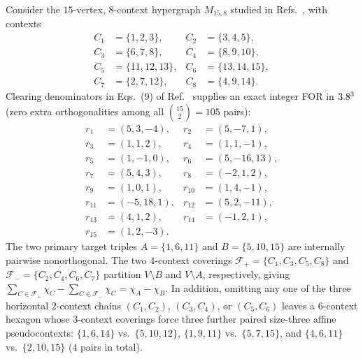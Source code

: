 \documentclass[aps,pra,reprint,superscriptaddress,longbibliography,nofootinbib,floatfix,10pt]{revtex4-2}
\theoremstyle{definition}\newtheorem{definition}[theorem]{Definition}
\theoremstyle{remark}\newtheorem{remark}[theorem]{Remark}
\begin{document}
Consider the $15$-vertex, $8$-context hypergraph $M_{15,8}$ studied in Refs.~\cite{Navara_1995,Mayet_2000,2023-navara-svozil,2026-Navara-Svozil-pseudocontexts}, with contexts
\begin{equation}\label{eq:M15-contexts}
\begin{aligned}
C_1&=\{1,2,3\},& C_2&=\{3,4,5\},\\
C_3&=\{6,7,8\},& C_4&=\{8,9,10\},\\
C_5&=\{11,12,13\},& C_6&=\{13,14,15\},\\
C_7&=\{2,7,12\},& C_8&=\{4,9,14\}.
\end{aligned}
\end{equation}
Clearing denominators in Eqs.~(9) of Ref.~\cite{2023-navara-svozil} supplies an exact integer FOR in $3.8^3$ (zero extra orthogonalities among all $\binom{15}{2}=105$ pairs):
\begin{equation}\label{eq:M15-vectors}
\begin{aligned}
r_1&=(5,3,-4),& r_2&=(5,-7,1),\\
r_3&=(1,1,2),& r_4&=(1,1,-1),\\
r_5&=(1,-1,0),& r_6&=(5,-16,13),\\
r_7&=(5,4,3),& r_8&=(-2,1,2),\\
r_9&=(1,0,1),& r_{10}&=(1,4,-1),\\
r_{11}&=(-5,18,1),& r_{12}&=(5,2,-11),\\
r_{13}&=(4,1,2),& r_{14}&=(-1,2,1),\\
r_{15}&=(1,2,-3).&&
\end{aligned}
\end{equation}
The two primary target triples $A=\{1,6,11\}$ and $B=\{5,10,15\}$ are internally pairwise nonorthogonal. The two $4$-context coverings $\mathcal{F}_+=\{C_1,C_3,C_5,C_8\}$ and $\mathcal{F}_-=\{C_2,C_4,C_6,C_7\}$ partition $V\setminus B$ and $V\setminus A$, respectively, giving $\sum_{C\in\mathcal{F}_+}\chi_C-\sum_{C\in\mathcal{F}_-}\chi_C=\chi_A-\chi_B$. In addition, omitting any one of the three horizontal $2$-context chains $(C_1,C_2)$, $(C_3,C_4)$, or $(C_5,C_6)$ leaves a $6$-context hexagon whose $3$-context coverings force three further paired size-three affine pseudocontexts: $\{1,6,14\}$ vs.\ $\{5,10,12\}$, $\{1,9,11\}$ vs.\ $\{5,7,15\}$, and $\{4,6,11\}$ vs.\ $\{2,10,15\}$ ($4$ pairs in total).
\end{document}
